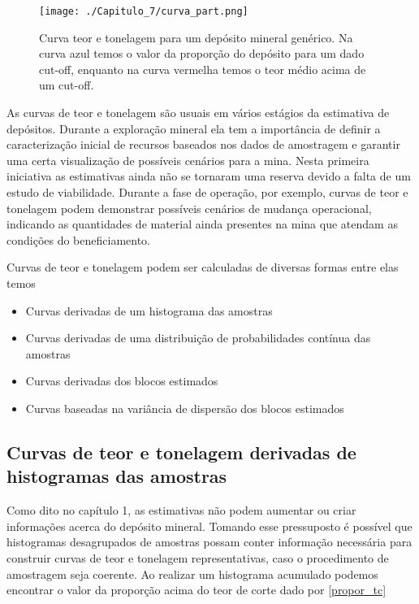 \begin{figure}[H]
	\centering
	\texttt{[image: ./Capitulo\_7/curva\_part.png]}	
	\caption{Curva teor e tonelagem para um depósito mineral genérico. Na curva azul temos o valor da proporção do depósito para um dado cut-off, enquanto na curva vermelha temos o teor médio acima de um cut-off.}
	\label{curva_part}
\end{figure}

As curvas de teor e tonelagem são usuais em vários estágios da estimativa de depósitos. Durante a exploração mineral ela tem a importância de definir a caracterização inicial de recursos baseados nos dados de amostragem e garantir uma certa visualização de possíveis cenários para a mina. Nesta primeira iniciativa as estimativas ainda não se tornaram uma reserva devido a falta de um estudo de viabilidade. Durante a fase de operação, por exemplo, curvas de teor e tonelagem podem demonstrar possíveis cenários de mudança operacional, indicando as quantidades de material ainda presentes na mina que atendam as condições do beneficiamento. 


 Curvas de teor e tonelagem podem ser calculadas de diversas formas entre elas temos

\begin{itemize}
	\item Curvas derivadas de um histograma das amostras
	\item Curvas derivadas de uma distribuição de probabilidades contínua das amostras
	\item Curvas derivadas dos blocos estimados
	\item Curvas baseadas na variância de dispersão dos blocos estimados
\end{itemize}

\subsection{Curvas de teor e tonelagem derivadas de histogramas das amostras} \label{teor_t1}

Como dito no capítulo 1, as estimativas não podem aumentar ou criar informações acerca do depósito mineral. Tomando esse pressuposto é possível que histogramas desagrupados de amostras possam conter informação necessária para construir curvas de teor e tonelagem representativas, caso o procedimento de amostragem seja coerente. Ao realizar um histograma acumulado podemos encontrar o valor da proporção acima do teor de corte dado por \eqref{propor_tc}


